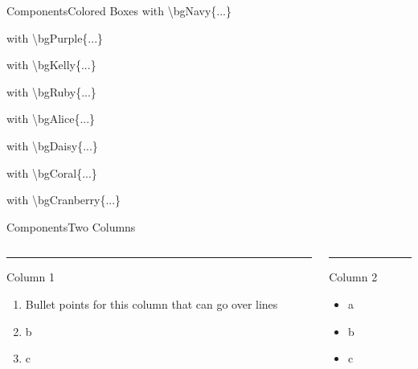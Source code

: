 \documentclass[aspectratio=43]{beamer}
\begin{document}
\begin{frame}{Components}{Colored Boxes}
   with \textbackslash bgNavy\{...\}

  \vspace{2.5mm}
   with \textbackslash bgPurple\{...\}

  \vspace{2.5mm}
   with \textbackslash bgKelly\{...\}

  \vspace{2.5mm}
   with \textbackslash bgRuby\{...\}

  \vspace{2.5mm}
   with \textbackslash bgAlice\{...\}

  \vspace{2.5mm}
   with \textbackslash bgDaisy\{...\}

  \vspace{2.5mm}
   with \textbackslash bgCoral\{...\}

  \vspace{2.5mm}
   with \textbackslash bgCranberry\{...\}
\end{frame}

\begin{frame}{Components}{Two Columns}
    \begin{columns}[T]
    \vspace{0pt}
    \begin{column}{.50\textwidth}
        \vspace{0pt}
        {\color{accent}\rule{\linewidth}{2pt}}
        Column 1

        \begin{enumerate}
            \item Bullet points for this column that can go over lines
            \item b
            \item c
        \end{enumerate}

        \vspace*{50mm} %
    \end{column}
    
    \hfill
    
    \begin{column}{.50\textwidth}
        {\color{accent}\rule{\linewidth}{2pt}}
        Column 2

        \begin{itemize}
            \item a
            \item b
            \item c
        \end{itemize}
    \end{column}
    \end{columns}
\end{frame}
\end{document}
